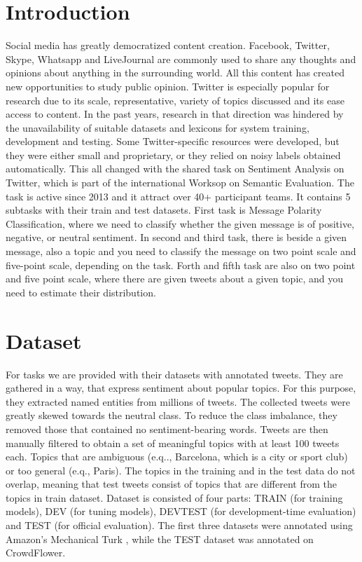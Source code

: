 \documentclass[runningheads,a4paper]{llncs}
\begin{document}
\section{Introduction}
Social media has greatly democratized content creation. Facebook, Twitter, Skype, Whatsapp and LiveJournal are commonly used to share any thoughts and opinions about anything in the surrounding world. All this content has created new opportunities to study public opinion. Twitter is especially popular for research due to its scale, representative, variety of topics discussed and its ease access to content. In the past years, research in that direction was hindered by the unavailability of suitable datasets and lexicons for system training, development and testing. Some Twitter-specific resources were developed, but they were either small and proprietary, or they relied on noisy labels obtained automatically. This all changed with the shared task on Sentiment Analysis on Twitter, which is part of the international Worksop on Semantic Evaluation. The task is active since 2013 and it attract over 40+ participant teams. It contains 5 subtasks with their train and test datasets. First task is Message Polarity Classification, where we need to classify whether the given message is of positive, negative, or neutral sentiment. In second and third task, there is beside a given message, also a topic and you need to classify the message on two point scale and five-point scale, depending on the task. Forth and fifth task are also on two point and five point scale, where there are given tweets about a given topic, and you need to estimate their distribution.



\section{Dataset}
For tasks we are provided with their datasets with annotated tweets. They are gathered in a way, that express sentiment about popular topics. For this purpose, they extracted named entities from millions of tweets. The collected tweets were greatly skewed towards the neutral class. To reduce the class imbalance, they removed those that contained no sentiment-bearing words. Tweets are then manually filtered to obtain a set of meaningful topics with at least 100 tweets each. Topics that are ambiguous (e.q.., Barcelona, which is a city or sport club) or too general (e.q., Paris). The topics in the training and in the test data do not overlap, meaning that test tweets consist of topics that are different from the topics in train dataset. Dataset is consisted of four parts: TRAIN (for training models), DEV (for tuning models), DEVTEST (for development-time evaluation) and TEST (for official evaluation). The first three datasets were annotated using Amazon's Mechanical Turk , while the TEST dataset was annotated on CrowdFlower. 
\end{document}
